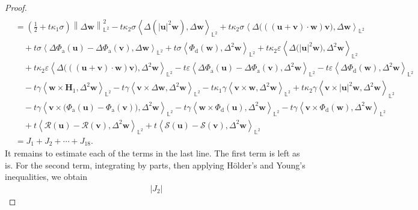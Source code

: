 \documentclass[11pt, reqno]{amsart}
\theoremstyle{definition}
\numberwithin{equation}{section}
\newcommand{\bff}{\boldsymbol}
\newcommand{\bb}{\mathbb}
\newcommand{\norm}[2]{\left\|{#1}\right\|_{#2}}
\newcommand{\inpro}[2]{\left\langle#1,#2\right\rangle}
\newcommand{\abs}[1]{\left|{#1}\right|}
\begin{document}
\begin{proof}
\begin{align}
    \nonumber \\
    &=
    \left(\frac12 + t\kappa_1\sigma\right) \norm{\Delta \bff{w}}{\bb{L}^2}^2
    -
    t\kappa_2 \sigma \inpro{\Delta(|\bff{u}|^2 \bff{w})}{\Delta \bff{w}}_{\bb{L}^2}
    +
    t\kappa_2 \sigma \inpro{\Delta\big(((\bff{u}+\bff{v})\cdot \bff{w})\bff{v}\big)}{\Delta \bff{w}}_{\bb{L}^2}
    \nonumber \\
    &\quad
    +
    t\sigma \inpro{\Delta\Phi_{\mathrm{a}}(\bff{u})- \Delta\Phi_{\mathrm{a}}(\bff{v})}{\Delta \bff{w}}_{\bb{L}^2}
    +
    t\sigma \inpro{\Phi_{\mathrm{d}} (\bff{w})}{\Delta^2 \bff{w}}_{\bb{L}^2}
    +
    t\kappa_2 \varepsilon \inpro{\Delta \big(|\bff{u}|^2 \bff{w}\big)}{\Delta^2 \bff{w}}_{\bb{L}^2}
    \nonumber \\
    &\quad
    +
    t\kappa_2 \varepsilon \inpro{\Delta\big(((\bff{u}+\bff{v})\cdot \bff{w})\bff{v}\big)}{\Delta^2 \bff{w}}_{\bb{L}^2}
    -
    t\varepsilon \inpro{\Delta \Phi_{\mathrm{a}}(\bff{u})-\Delta \Phi_{\mathrm{a}}(\bff{v})}{\Delta^2 \bff{w}}_{\bb{L}^2}
    -
    t\varepsilon \inpro{\Delta \Phi_{\mathrm{d}}(\bff{w})}{\Delta^2 \bff{w}}_{\bb{L}^2}
    \nonumber \\
    &\quad
    -
    t\gamma \inpro{\bff{w}\times \bff{H}_1}{\Delta^2 \bff{w}}_{\bb{L}^2}
    -t\gamma \inpro{\bff{v}\times \Delta\bff{w}}{\Delta^2 \bff{w}}_{\bb{L}^2}
    -
    t\kappa_1 \gamma \inpro{\bff{v}\times \bff{w}}{\Delta^2 \bff{w}}_{\bb{L}^2}
    +
    t\kappa_2 \gamma \inpro{\bff{v}\times |\bff{u}|^2 \bff{w}}{\Delta^2 \bff{w}}_{\bb{L}^2}
    \nonumber \\
    &\quad
    -
    t\gamma \inpro{\bff{v} \times \big(\Phi_{\mathrm{a}}(\bff{u})-\Phi_{\mathrm{a}}(\bff{v})\big)}{\Delta^2 \bff{w}}_{\bb{L}^2}
    -
    t\gamma \inpro{\bff{w}\times \Phi_{\mathrm{d}}(\bff{u})}{\Delta^2 \bff{w}}_{\bb{L}^2}
    -
    t\gamma \inpro{\bff{v} \times \Phi_{\mathrm{d}}(\bff{w})}{\Delta^2 \bff{w}}_{\bb{L}^2}
    \nonumber \\
    &\quad
    +
    t \inpro{\mathcal{R}(\bff{u})-\mathcal{R}(\bff{v})}{\Delta^2 \bff{w}}_{\bb{L}^2}
    +
    t \inpro{\mathcal{S}(\bff{u})-\mathcal{S}(\bff{v})}{\Delta^2 \bff{w}}_{\bb{L}^2}
    \nonumber \\
    &=
    J_1+J_2+\cdots+J_{18}.
\end{align}
It remains to estimate each of the terms in the last line. The first term is left as is. For the second term, integrating by parts, then applying H\"older's and Young's inequalities, we obtain
\begin{align*}
    \abs{J_2}

\end{align*}
\end{proof}
\end{document}
